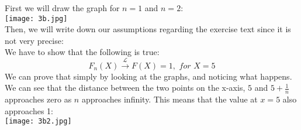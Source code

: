 First we will draw the graph for $n=1$ and $n=2$:\\
\texttt{[image: 3b.jpg]}\\
Then, we will write down our assumptions regarding the exercise text since it is not very precise:\\
We have to show that the following is true:
$$
F_n(X) \xrightarrow{\mathcal{L}} F(X) = 1, \textit{ for } X = 5
$$
We can prove that simply by looking at the graphs, and noticing what happens. We can see that the distance between the two points on the x-axis, $5$ and $5+\frac{1}{n}$ approaches zero as $n$ approaches infinity. This means that the value at $x=5$ also approaches 1:\\
\texttt{[image: 3b2.jpg]}\\